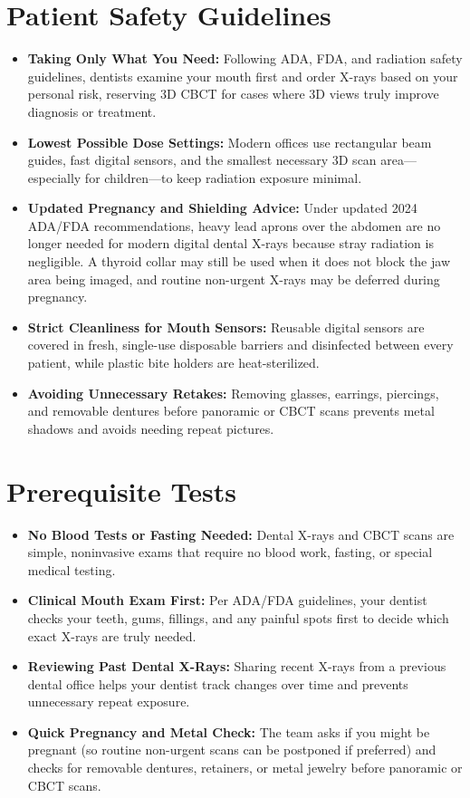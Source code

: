 \section{Patient Safety Guidelines}
\begin{itemize}
\item \textbf{Taking Only What You Need:} Following ADA, FDA, and radiation safety guidelines, dentists examine your mouth first and order X-rays based on your personal risk, reserving 3D CBCT for cases where 3D views truly improve diagnosis or treatment.
\item \textbf{Lowest Possible Dose Settings:} Modern offices use rectangular beam guides, fast digital sensors, and the smallest necessary 3D scan area---especially for children---to keep radiation exposure minimal.
\item \textbf{Updated Pregnancy and Shielding Advice:} Under updated 2024 ADA/FDA recommendations, heavy lead aprons over the abdomen are no longer needed for modern digital dental X-rays because stray radiation is negligible. A thyroid collar may still be used when it does not block the jaw area being imaged, and routine non-urgent X-rays may be deferred during pregnancy.
\item \textbf{Strict Cleanliness for Mouth Sensors:} Reusable digital sensors are covered in fresh, single-use disposable barriers and disinfected between every patient, while plastic bite holders are heat-sterilized.
\item \textbf{Avoiding Unnecessary Retakes:} Removing glasses, earrings, piercings, and removable dentures before panoramic or CBCT scans prevents metal shadows and avoids needing repeat pictures.
\end{itemize}

\section{Prerequisite Tests}
\begin{itemize}
\item \textbf{No Blood Tests or Fasting Needed:} Dental X-rays and CBCT scans are simple, noninvasive exams that require no blood work, fasting, or special medical testing.
\item \textbf{Clinical Mouth Exam First:} Per ADA/FDA guidelines, your dentist checks your teeth, gums, fillings, and any painful spots first to decide which exact X-rays are truly needed.
\item \textbf{Reviewing Past Dental X-Rays:} Sharing recent X-rays from a previous dental office helps your dentist track changes over time and prevents unnecessary repeat exposure.
\item \textbf{Quick Pregnancy and Metal Check:} The team asks if you might be pregnant (so routine non-urgent scans can be postponed if preferred) and checks for removable dentures, retainers, or metal jewelry before panoramic or CBCT scans.
\end{itemize}

